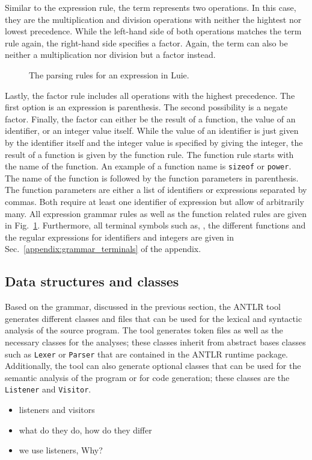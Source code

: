 Similar to the expression rule, the term represents two operations. In this case, they are the multiplication and division operations with neither the hightest nor lowest precedence. While the left-hand side of both operations matches the term rule again, the right-hand side specifies a factor. Again, the term can also be neither a multiplication nor division but a factor instead.

\begin{figure}[htp]
    \centering
    
    \caption{The parsing rules for an expression in Luie.}
    \label{fig:implementation_expression}
\end{figure}

Lastly, the factor rule includes all operations with the highest precedence. The first option is an expression is parenthesis. 
The second possibility is a negate factor. Finally, the factor can either be the result of a function, the value of an identifier, or an integer value itself. While the value of an identifier is just given by the identifier itself and the integer value is specified by giving the integer, the result of a function is given by the function rule. The function rule starts with the name of the function. An example of a function name is \texttt{sizeof} or \texttt{power}. The name of the function is followed by the function parameters in parenthesis. The function parameters are either a list of identifiers or expressions separated by commas. Both require at least one identifier of expression but allow of arbitrarily many. 
All expression grammar rules as well as the function related rules are given in Fig.~\ref{fig:implementation_expression}. Furthermore, all terminal symbols such as, \eg, the different functions and the regular expressions for identifiers and integers are given in Sec.~\ref{appendix:grammar_terminals} of the appendix.

\subsection{Data structures and classes}
\label{sec:implementation_syntax_dataStructuresClasses}
Based on the grammar, discussed in the previous section, the ANTLR tool generates different classes and files that can be used for the lexical and syntactic analysis of the source program. The tool generates token files as well as the necessary classes for the analyses; these classes inherit from abstract bases classes such as \texttt{Lexer} or \texttt{Parser} that are contained in the ANTLR runtime package. Additionally, the tool can also generate optional classes that can be used for the semantic analysis of the program or for code generation; these classes are the \texttt{Listener} and \texttt{Visitor}.

\begin{itemize}
    \item listeners and visitors
    \item what do they do, how do they differ
    \item we use listeners, Why?
\end{itemize}
